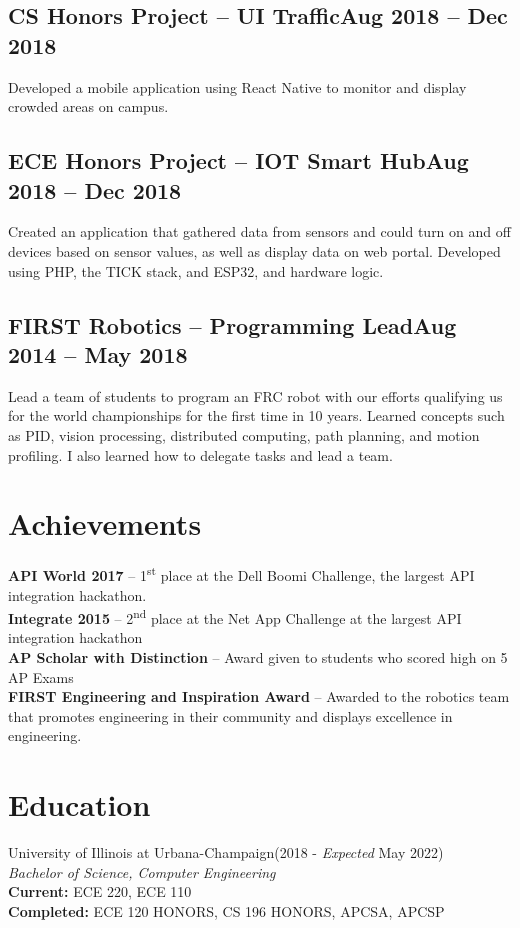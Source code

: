 \documentclass[letterpaper,12pt]{article}
\begin{document}
\subsection{CS Honors Project -- UI Traffic\null\hfill Aug 2018 -- Dec 2018}
Developed a mobile application using React Native to monitor and display crowded areas on campus.
\vspace*{-2mm}
\subsection{ECE Honors Project -- IOT Smart Hub\null\hfill Aug 2018 -- Dec 2018}
Created an application that gathered data from sensors and could turn on and off devices based on sensor values, as well as display data on web portal.
Developed using PHP, the TICK stack, and ESP32, and hardware logic.
\subsection{FIRST Robotics -- Programming Lead\null\hfill Aug 2014 -- May 2018}
Lead a team of students to program an FRC robot with our efforts qualifying us for the world championships for the first time in 10 years.
Learned concepts such as PID, vision processing, distributed computing, path planning, and motion profiling.
I also learned how to delegate tasks and lead a team.
\section{Achievements}
{\bfseries API World 2017} -- 1\textsuperscript{st} place at the Dell Boomi Challenge, the largest API integration hackathon.\\
{\bfseries Integrate 2015} -- 2\textsuperscript{nd} place at the Net App Challenge at the largest API integration hackathon\\
{\bfseries AP Scholar with Distinction} -- Award given to students who scored high on 5 AP Exams\\
{\bfseries FIRST Engineering and Inspiration Award} -- Awarded to the robotics team that promotes engineering in their community and displays excellence in engineering.
\section{Education}
University of Illinois at Urbana-Champaign\null\hfill(2018 - \emph{Expected} May 2022)\\
\emph{Bachelor of Science, Computer Engineering}\\
{\bfseries Current: }ECE 220, ECE 110\\
{\bfseries Completed: }ECE 120 HONORS, CS 196 HONORS, APCSA, APCSP\\
\end{document}
